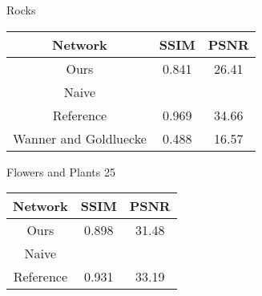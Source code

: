 \documentclass[10pt,twocolumn,letterpaper]{article}
\begin{document}
\pagebreak

\begin{center}
Rocks

\begin{tabular}{|c c c|}
    Network & SSIM & PSNR \\ \hline
    Ours & 0.841 & 26.41 \\
    Naive & & \\
    Reference & 0.969 & 34.66 \\ 
    Wanner and Goldluecke & 0.488 & 16.57 
\end{tabular}
\end{center}

\medspace

\begin{center}
Flowers and Plants 25

\begin{tabular}{|c c c|}
    Network & SSIM & PSNR \\ \hline
    Ours & 0.898 & 31.48 \\
    Naive & & \\
    Reference & 0.931 & 33.19 \\ 
\end{tabular}
\end{center}


{\small


}
\end{document}
